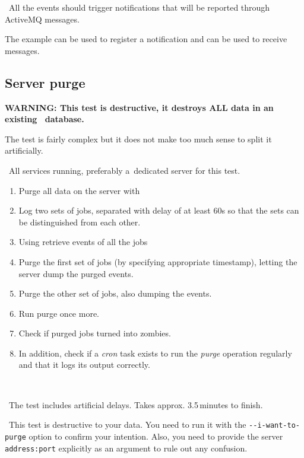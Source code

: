 \result\ All the events should trigger notifications that will be reported 
through ActiveMQ messages.

\begin{hints}
The  example can be used to register a notification and  can be used to receive messages.
\end{hints}




\subsection{Server purge}

\textbf{WARNING: This test is destructive, it destroys ALL data in an
existing \LB\ database.}

The test is fairly complex but it does not make too much sense to split it
artificially.

\req\ All \LB services running, preferably a~dedicated server for this test.

\what
\begin{enumerate}
\item Purge all data on the server with 
\item Log two sets of jobs, separated with delay of at least 60s so
that the sets can be distinguished from each other.
\item \label{purge1}
Using  retrieve events of all the jobs
\item \label{purge2}
Purge the first set of jobs (by specifying appropriate timestamp),
letting the server dump the purged events.
\item \label{purge3} Purge the other set of jobs, also dumping the events.
\item \label{purge4} Run purge once more.
\item Check if purged jobs turned into zombies.
\item In addition, check if a \emph{cron} task exists to run the \emph{purge} operation regularly and that it logs its output correctly.
\end{enumerate}

\how\ 

\note\ The test includes artificial delays. Takes approx. 3.5\,minutes to finish.

\note\ This test is destructive to your data. You need to run it with the \texttt{-{}-i-want-to-purge} option to confirm your intention. Also, you need to provide the \LB server \texttt{address:port} explicitly as an argument to rule out any confusion. 

